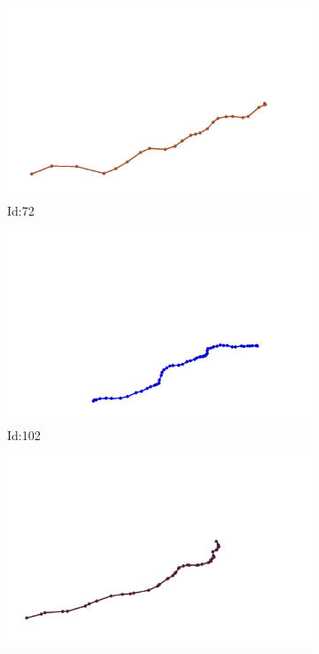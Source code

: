 \documentclass[12pt,twoside]{report}
\begin{document}
\begin{figure}
\centering
\begin{subfigure}[b]{0.20\textwidth}
\centering
\includegraphics[width=\textwidth]{../../trajectories/72.png}
\caption{Id:72}
\end{subfigure}
\begin{subfigure}[b]{0.20\textwidth}
\centering
\includegraphics[width=\textwidth]{../../trajectories/102.png}
\caption{Id:102}
\end{subfigure}
\begin{subfigure}[b]{0.20\textwidth}
\centering
\includegraphics[width=\textwidth]{../../trajectories/365.png}

\end{subfigure}
\end{figure}
\end{document}
